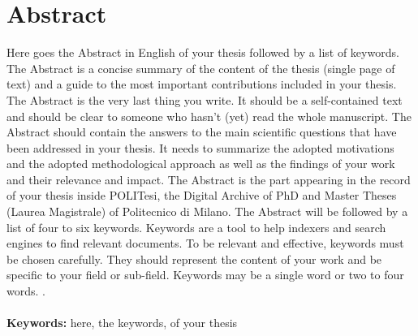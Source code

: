 \documentclass{Configuration_Files/PoliMi3i_thesis}
\begin{document}


\pagestyle{empty} %
\frontmatter %


\startpreamble
\setcounter{page}{1} %

\chapter*{Abstract} 
Here goes the Abstract in English of your thesis followed by a list of keywords.
The Abstract is a concise summary of the content of the thesis (single page of text)
and a guide to the most important contributions included in your thesis.
The Abstract is the very last thing you write.
It should be a self-contained text and should be clear to someone who hasn't (yet) read the whole manuscript.
The Abstract should contain the answers to the main scientific questions that have been addressed in your thesis.
It needs to summarize the adopted motivations and the adopted methodological approach as well as the findings of your work and their relevance and impact.
The Abstract is the part appearing in the record of your thesis inside POLITesi,
the Digital Archive of PhD and Master Theses (Laurea Magistrale) of Politecnico di Milano.
The Abstract will be followed by a list of four to six keywords.
Keywords are a tool to help indexers and search engines to find relevant documents.
To be relevant and effective, keywords must be chosen carefully.
They should represent the content of your work and be specific to your field or sub-field.
Keywords may be a single word or two to four words. .
\\
\\
\textbf{Keywords:} here, the keywords, of your thesis %
\end{document}
